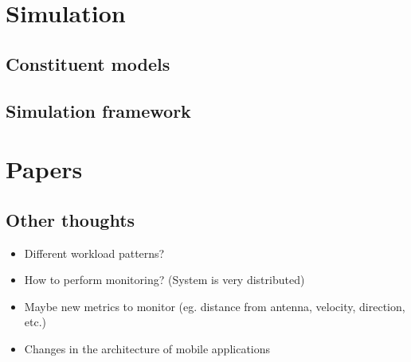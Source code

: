 \documentclass[conference]{IEEEtran}
\begin{document}
\section{Simulation}

\subsection{Constituent models}


\subsection{Simulation framework}



\section{Papers}



\subsection{Other thoughts} 

\begin{itemize}
\item Different workload patterns?
\item How to perform monitoring? (System is very distributed)
\item Maybe new metrics to monitor (eg. distance from antenna, velocity, direction, etc.)
\item Changes in the architecture of mobile applications
\end{itemize}




\end{document}
